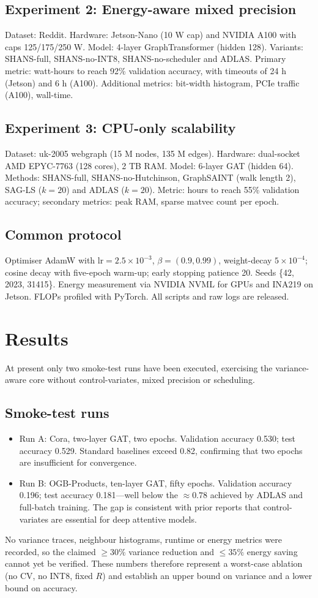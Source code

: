 \documentclass{article}
\begin{document}
\subsection{Experiment 2: Energy-aware mixed precision}
Dataset: Reddit. Hardware: Jetson-Nano (10 W cap) and NVIDIA A100 with caps 125/175/250 W. Model: 4-layer GraphTransformer (hidden 128). Variants: SHANS-full, SHANS-no-INT8, SHANS-no-scheduler and ADLAS. Primary metric: watt-hours to reach 92\% validation accuracy, with timeouts of 24 h (Jetson) and 6 h (A100). Additional metrics: bit-width histogram, PCIe traffic (A100), wall-time.
\subsection{Experiment 3: CPU-only scalability}
Dataset: uk-2005 webgraph (15 M nodes, 135 M edges). Hardware: dual-socket AMD EPYC-7763 (128 cores), 2 TB RAM. Model: 6-layer GAT (hidden 64). Methods: SHANS-full, SHANS-no-Hutchinson, GraphSAINT (walk length 2), SAG-LS (\(k=20\)) and ADLAS (\(k=20\)). Metric: hours to reach 55\% validation accuracy; secondary metrics: peak RAM, sparse matvec count per epoch.
\subsection{Common protocol}
Optimiser AdamW with \(\mathrm{lr}=2.5\times 10^{-3}\), \(\beta=(0.9,0.99)\), weight-decay \(5\times 10^{-4}\); cosine decay with five-epoch warm-up; early stopping patience 20. Seeds \{42, 2023, 31415\}. Energy measurement via NVIDIA NVML for GPUs and INA219 on Jetson. FLOPs profiled with PyTorch. All scripts and raw logs are released.

\section{Results}
At present only two smoke-test runs have been executed, exercising the variance-aware core without control-variates, mixed precision or scheduling.
\subsection{Smoke-test runs}
\begin{itemize}
  \item Run A: Cora, two-layer GAT, two epochs. Validation accuracy 0.530; test accuracy 0.529. Standard baselines exceed 0.82, confirming that two epochs are insufficient for convergence.
  \item Run B: OGB-Products, ten-layer GAT, fifty epochs. Validation accuracy 0.196; test accuracy 0.181—well below the \(\approx 0.78\) achieved by ADLAS and full-batch training. The gap is consistent with prior reports that control-variates are essential for deep attentive models.
\end{itemize}
No variance traces, neighbour histograms, runtime or energy metrics were recorded, so the claimed \(\ge 30\%\) variance reduction and \(\le 35\%\) energy saving cannot yet be verified. These numbers therefore represent a worst-case ablation (no CV, no INT8, fixed \(R\)) and establish an upper bound on variance and a lower bound on accuracy.
\end{document}
